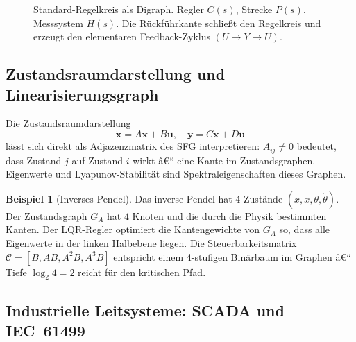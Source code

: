 ﻿\documentclass[12pt,a4paper,twoside]{article}
\theoremstyle{definition}
\newtheorem{beispiel}{Beispiel}[section]
\theoremstyle{plain}
\theoremstyle{remark}
\begin{document}
\begin{figure}[h]
  \centering
  \caption{Standard-Regelkreis als Digraph.  Regler $C(s)$,
           Strecke $P(s)$, Messsystem $H(s)$.  Die Rückführkante
           schließt den Regelkreis und erzeugt den elementaren
           Feedback-Zyklus $(U \to Y \to U)$.}
  \label{fig:regelkreis}
\end{figure}

\subsection{Zustandsraumdarstellung und Linearisierungsgraph}

Die Zustandsraumdarstellung
\[
  \dot{\mathbf{x}} = A\mathbf{x} + B\mathbf{u}, \quad
  \mathbf{y} = C\mathbf{x} + D\mathbf{u}
\]
lässt sich direkt als Adjazenzmatrix des SFG interpretieren:
$A_{ij} \neq 0$ bedeutet, dass Zustand $j$ auf Zustand $i$ wirkt â€“
eine Kante im Zustandsgraphen.  Eigenwerte und Lyapunov-Stabilität
sind Spektraleigenschaften dieses Graphen.

\begin{beispiel}[Inverses Pendel]
Das inverse Pendel hat 4 Zustände $(x, \dot{x}, \theta, \dot{\theta})$.
Der Zustandsgraph $G_A$ hat $4$ Knoten und die durch die
Physik bestimmten Kanten.  Der LQR-Regler optimiert die
Kantengewichte von $G_A$ so, dass alle Eigenwerte in der
linken Halbebene liegen.  Die Steuerbarkeitsmatrix
$\mathcal{C} = [B, AB, A^2B, A^3B]$ entspricht einem
4-stufigen Binärbaum im Graphen â€“ Tiefe $\log_2 4 = 2$ reicht
für den kritischen Pfad.
\end{beispiel}

\subsection{Industrielle Leitsysteme: SCADA und IEC~61499}
\end{document}
